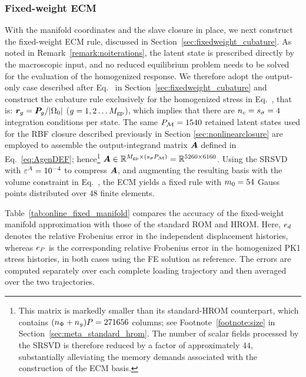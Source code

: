 \documentclass[preprint,10pt]{elsarticle}  %
\begin{document}
\subsubsection{Fixed-weight ECM}
\label{sec:fixedECM1}
With the manifold coordinates and the slave closure in place, we next
construct the fixed-weight ECM rule, discussed in Section~\ref{sec:fixedweight_cubature}. As noted in Remark~\ref{remark:noiterations},  the latent state is prescribed directly by the macroscopic
input, and no reduced equilibrium problem needs
to be solved for the evaluation of the homogenized response. We
therefore adopt the output-only case described after
Eq.~ in Section~\ref{sec:fixedweight_cubature}  and construct the cubature rule exclusively
for the homogenized stress in Eq.~, that is:  $\bm{r}_{g}= {\boldsymbol{P}_g}/{|\Omega_0|}$ ($g=1,2 \ldots M_{\mathrm{gp}}$), which implies that there are  $n_c = s_{\sigma} = 4$ integration conditions per state. The same \(P_{\mathcal{M}}=1540\) retained latent states used for the RBF closure described previously in Section \ref{sec:nonlinearclosure} are employed to assemble the output-integrand matrix $\bm{A}$ defined in Eq.~\ref{eq:AgenDEF}; hence\footnote{This matrix is markedly smaller than its standard-HROM
counterpart, which contains
\((n_{\Phi}+n_{{y}})P=271656\) columns; see
Footnote~\ref{footnote:size} in
Section~\ref{sec:meta_standard_hrom}. The number of scalar fields
processed by the SRSVD is therefore reduced by a factor of
approximately \(44\), substantially alleviating the memory demands
associated with the construction of the ECM basis. }  $\bm{A} \in
    \mathbb{R}^{M_{\mathrm{gp}}\times(s_{\sigma}P_{\mathcal{M}})}     =     \mathbb{R}^{5260\times6160}$. Using the SRSVD with \(\varepsilon^A=10^{-4}\) to compress \(\bm{A}\), and
augmenting the resulting basis with the volume constraint in
Eq.~, the ECM yields a fixed rule with
\(m_0=54\) Gauss points distributed over \(48\) finite elements.

Table~\ref{tab:online_fixed_manifold} compares  the accuracy of the fixed-weight manifold
approximation with those of the standard ROM and HROM. Here,
\(e_d\) denotes the relative Frobenius error in the independent
displacement histories, whereas \(e_P\) is the corresponding
relative Frobenius error in the homogenized PK1 stress histories, in
both cases using the FE solution as reference. The errors are computed
separately over each complete loading trajectory and then averaged over
the two trajectories.
\end{document}

